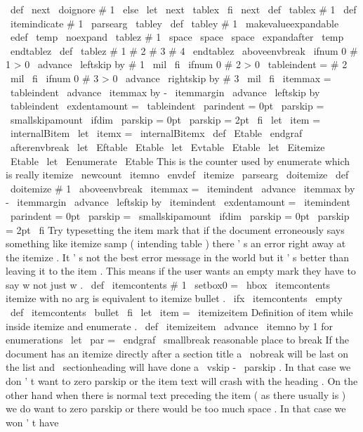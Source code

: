 {{{{{}
%
\
def
\
next
{
\
doignore
{
#
1
}
}
%
\
else
\
let
\
next
\
tablex
\
fi
\
next
}
\
def
\
tablex
#
1
{
%
\
def
\
itemindicate
{
#
1
}
%
\
parsearg
\
tabley
}
\
def
\
tabley
#
1
{
%
{
%
\
makevalueexpandable
\
edef
\
temp
{
\
noexpand
\
tablez
#
1
\
space
\
space
\
space
}
%
\
expandafter
}
\
temp
\
endtablez
}
\
def
\
tablez
#
1
#
2
#
3
#
4
\
endtablez
{
%
\
aboveenvbreak
\
ifnum
0
#
1
>
0
\
advance
\
leftskip
by
#
1
\
mil
\
fi
\
ifnum
0
#
2
>
0
\
tableindent
=
#
2
\
mil
\
fi
\
ifnum
0
#
3
>
0
\
advance
\
rightskip
by
#
3
\
mil
\
fi
\
itemmax
=
\
tableindent
\
advance
\
itemmax
by
-
\
itemmargin
\
advance
\
leftskip
by
\
tableindent
\
exdentamount
=
\
tableindent
\
parindent
=
0pt
\
parskip
=
\
smallskipamount
\
ifdim
\
parskip
=
0pt
\
parskip
=
2pt
\
fi
\
let
\
item
=
\
internalBitem
\
let
\
itemx
=
\
internalBitemx
}
\
def
\
Etable
{
\
endgraf
\
afterenvbreak
}
\
let
\
Eftable
\
Etable
\
let
\
Evtable
\
Etable
\
let
\
Eitemize
\
Etable
\
let
\
Eenumerate
\
Etable
%
This
is
the
counter
used
by
enumerate
which
is
really
itemize
\
newcount
\
itemno
\
envdef
\
itemize
{
\
parsearg
\
doitemize
}
\
def
\
doitemize
#
1
{
%
\
aboveenvbreak
\
itemmax
=
\
itemindent
\
advance
\
itemmax
by
-
\
itemmargin
\
advance
\
leftskip
by
\
itemindent
\
exdentamount
=
\
itemindent
\
parindent
=
0pt
\
parskip
=
\
smallskipamount
\
ifdim
\
parskip
=
0pt
\
parskip
=
2pt
\
fi
%
%
Try
typesetting
the
item
mark
that
if
the
document
erroneously
says
%
something
like
itemize
samp
(
intending
table
)
there
'
s
an
error
%
right
away
at
the
itemize
.
It
'
s
not
the
best
error
message
in
the
%
world
but
it
'
s
better
than
leaving
it
to
the
item
.
This
means
if
%
the
user
wants
an
empty
mark
they
have
to
say
w
{
}
not
just
w
.
\
def
\
itemcontents
{
#
1
}
%
\
setbox0
=
\
hbox
{
\
itemcontents
}
%
%
%
itemize
with
no
arg
is
equivalent
to
itemize
bullet
.
\
ifx
\
itemcontents
\
empty
\
def
\
itemcontents
{
\
bullet
}
\
fi
%
\
let
\
item
=
\
itemizeitem
}
%
Definition
of
item
while
inside
itemize
and
enumerate
.
%
\
def
\
itemizeitem
{
%
\
advance
\
itemno
by
1
%
for
enumerations
{
\
let
\
par
=
\
endgraf
\
smallbreak
}
%
reasonable
place
to
break
{
%
%
If
the
document
has
an
itemize
directly
after
a
section
title
a
%
\
nobreak
will
be
last
on
the
list
and
\
sectionheading
will
have
%
done
a
\
vskip
-
\
parskip
.
In
that
case
we
don
'
t
want
to
zero
%
parskip
or
the
item
text
will
crash
with
the
heading
.
On
the
%
other
hand
when
there
is
normal
text
preceding
the
item
(
as
there
%
usually
is
)
we
do
want
to
zero
parskip
or
there
would
be
too
much
%
space
.
In
that
case
we
won
'
t
have
}}}}}
